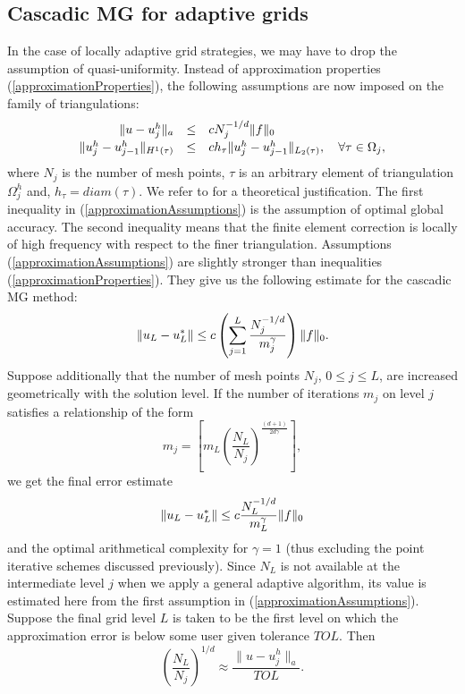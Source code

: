 \subsection{Cascadic MG for adaptive grids}
In the case of locally adaptive grid strategies, we may have to drop
the assumption of quasi-uniformity. Instead of approximation
properties (\ref{approximationProperties}), the following assumptions
are now imposed on the family of triangulations:
\begin{equation}
  \label{approximationAssumptions}
  \begin{array}{rcl}
    \| u - u_j^h \|_a  &\le&  c N_j^{-1/d} {\| f \|_0} \\[.5ex]
    \| u_j^h - u_{j-1}^h \|_{H^1(\tau)}  &\le&
    c h_\tau \| u_j^h - u_{j-1}^h\|_{L_2(\tau)},
    \quad \forall \tau \in \Omega_j,
  \end{array}
\end{equation}
where $N_j$ is the number of mesh points, $\tau$ is an arbitrary element of triangulation $\Omega_j^h$ and,
$h_\tau = diam(\tau)$.
We refer to \cite{BraPasWanXu91} for a theoretical justification.
The first inequality in (\ref{approximationAssumptions}) is the
assumption of optimal global accuracy. The second inequality
means that the finite element correction is locally of high frequency
with respect to the finer triangulation.
Assumptions  (\ref{approximationAssumptions}) are slightly stronger
than inequalities  (\ref{approximationProperties}). They give us the
following estimate for the cascadic MG method:
$$
\| u_L - u_L^* \| \le c
\left( \sum\limits_{j=1}^L \frac{N_j^{-1/d}}{m_j^\gamma} \right) {\| f \|_0}.
$$
Suppose additionally that the number of mesh points $N_j$, $0 \le j \le
L$, are
increased geometrically with the solution level. If the number of
iterations
$m_j$ on level $j$ satisfies a relationship of the form
$$
m_j = \left[ m_L \left( \frac{N_L}{N_j} \right)^{\frac{(d+1)}{2d\gamma}}
  \right],
$$
we get the final error estimate
$$
\| u_L - u_L^* \| \le c \frac{N_L^{-1/d}}{m_L^\gamma} {\| f \|_0}
$$
and the optimal arithmetical complexity for $\gamma = 1$ (thus excluding the point iterative schemes discussed previously). Since $N_L$ is
not available at the intermediate level $j$ when we apply a general
adaptive algorithm, its value
is estimated here from the first assumption in
(\ref{approximationAssumptions}).
Suppose the final grid level $L$ is taken to be the first level on which
the
approximation error is below some user given tolerance $TOL$. Then
$$
\left( \frac{N_L}{N_j} \right)^{1/d} \approx \frac{\| u - u_j^h
\|_a}{TOL}.
$$



